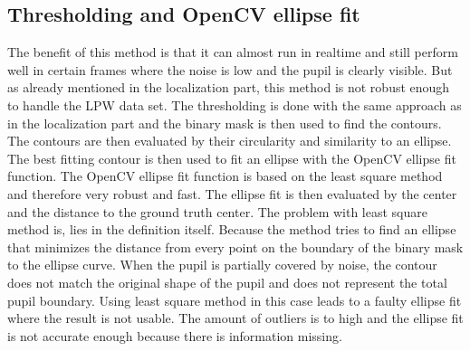 \subsection{Thresholding and OpenCV ellipse fit}
The benefit of this method is that it can almost run in realtime and still perform well in certain frames where the noise is low and the pupil is clearly visible. But as already mentioned in the localization part, this method is not robust enough to handle the LPW data set. The thresholding is done with the same approach as in the localization part and the binary mask is then used to find the contours. The contours are then evaluated by their circularity and similarity to an ellipse. The best fitting contour is then used to fit an ellipse with the OpenCV ellipse fit function. The OpenCV ellipse fit function is based on the least square method and therefore very robust and fast. The ellipse fit is then evaluated by the center and the distance to the ground truth center. The problem with least square method is, lies in the definition itself. Because the method tries to find an ellipse that minimizes the distance from every point on the boundary of the binary mask to the ellipse curve. When the pupil is partially covered by noise, the contour does not match the original shape of the pupil and does not represent the total pupil boundary. Using least square method in this case leads to a faulty ellipse fit where the result is not usable. The amount of outliers is to high and the ellipse fit is not accurate enough because there is information missing. 
